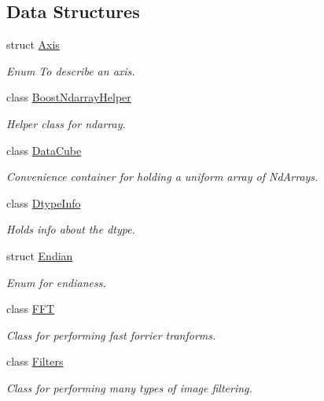 \subsection*{Data Structures}
\begin{DoxyCompactItemize}
\item 
struct \mbox{\hyperlink{struct_num_cpp_1_1_axis}{Axis}}
\begin{DoxyCompactList}\small\item\em Enum To describe an axis. \end{DoxyCompactList}\item 
class \mbox{\hyperlink{class_num_cpp_1_1_boost_ndarray_helper}{Boost\+Ndarray\+Helper}}
\begin{DoxyCompactList}\small\item\em Helper class for ndarray. \end{DoxyCompactList}\item 
class \mbox{\hyperlink{class_num_cpp_1_1_data_cube}{Data\+Cube}}
\begin{DoxyCompactList}\small\item\em Convenience container for holding a uniform array of Nd\+Arrays. \end{DoxyCompactList}\item 
class \mbox{\hyperlink{class_num_cpp_1_1_dtype_info}{Dtype\+Info}}
\begin{DoxyCompactList}\small\item\em Holds info about the dtype. \end{DoxyCompactList}\item 
struct \mbox{\hyperlink{struct_num_cpp_1_1_endian}{Endian}}
\begin{DoxyCompactList}\small\item\em Enum for endianess. \end{DoxyCompactList}\item 
class \mbox{\hyperlink{class_num_cpp_1_1_f_f_t}{F\+FT}}
\begin{DoxyCompactList}\small\item\em Class for performing fast forrier tranforms. \end{DoxyCompactList}\item 
class \mbox{\hyperlink{class_num_cpp_1_1_filters}{Filters}}
\begin{DoxyCompactList}\small\item\em Class for performing many types of image filtering. \end{DoxyCompactList}\item 

\end{DoxyCompactItemize}
